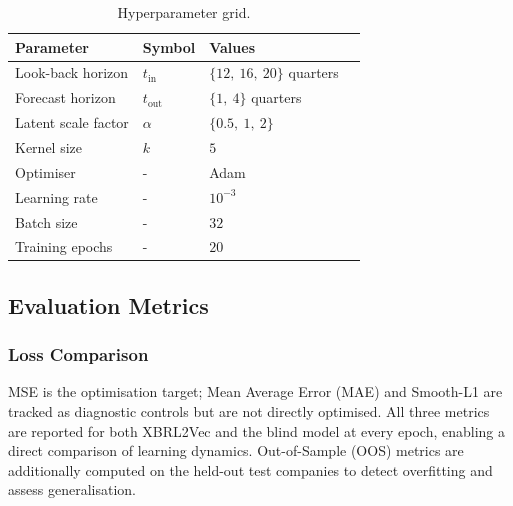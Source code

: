 \documentclass[a4paper,fleqn]{cas-dc}
\begin{document}
\begin{table}
\centering
\caption{Hyperparameter grid.}
\label{tab:hyperparam_grid}
\begin{tabular}{llll}
\toprule
\textbf{Parameter} & \textbf{Symbol} & \textbf{Values} \\
\midrule
Look-back horizon & $t_{\mathrm{in}}$ & $\{12,\ 16,\ 20\}$ quarters  \\
Forecast horizon  & $t_{\mathrm{out}}$ & $\{1,\ 4\}$ quarters        \\
Latent scale factor & $\alpha$         & $\{0.5,\ 1,\ 2\}$           \\
\midrule
Kernel size       & $k$               & $5$                          \\
Optimiser         &  -                 & Adam                         \\
Learning rate     &  -                 & $10^{-3}$                    \\
Batch size        &  -                & $32$                         \\
Training epochs   &  -                & $20$                         \\
\bottomrule
\end{tabular}
\end{table}

\subsection{Evaluation Metrics}

\subsubsection{Loss Comparison}
MSE is the optimisation target; Mean Average Error (MAE) and Smooth-L1 are tracked as diagnostic controls but are not directly optimised.  All three metrics are reported for both XBRL2Vec and the blind model at every epoch, enabling a direct comparison of learning dynamics.  Out-of-Sample (OOS) metrics are additionally computed on the held-out test companies to detect overfitting and assess generalisation.
\end{document}
